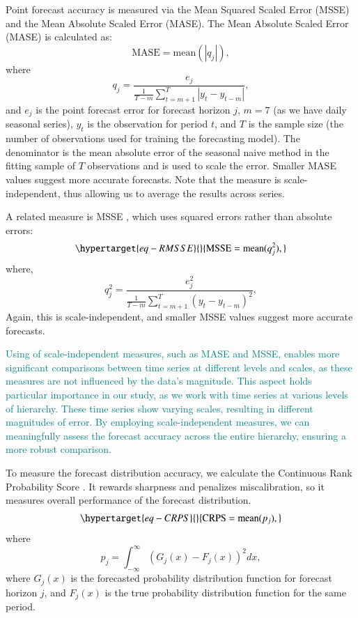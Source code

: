 \documentclass[
  authoryear,
  preprint,
  3p]{elsarticle}
\begin{document}
Point forecast accuracy is measured via the Mean Squared Scaled Error
(MSSE) and the Mean Absolute Scaled Error (MASE). The Mean Absolute
Scaled Error (MASE) \citep{HK06, hyndman2021forecasting} is calculated
as: \[
  \text{MASE} = \text{mean}(|q_{j}|),
\] where \[
  q_{j} = \frac{ e_{j}}
 {\displaystyle\frac{1}{T-m}\sum_{t=m+1}^T |y_{t}-y_{t-m}|},
\] and \(e_{j}\) is the point forecast error for forecast horizon \(j\),
\(m = 7\) (as we have daily seasonal series), \(y_t\) is the observation
for period \(t\), and \(T\) is the sample size (the number of
observations used for training the forecasting model). The denominator
is the mean absolute error of the seasonal naive method in the fitting
sample of \(T\) observations and is used to scale the error. Smaller
MASE values suggest more accurate forecasts. Note that the measure is
scale-independent, thus allowing us to average the results across
series.

A related measure is MSSE
\citep{hyndman2021forecasting, makridakis2022m5}, which uses squared
errors rather than absolute errors:
\begin{equation}\protect\hypertarget{eq-RMSSE}{}{
  \text{MSSE} = \text{mean}(q_{j}^2),
}\label{eq-RMSSE}\end{equation} where, \[
  q^2_{j} = \frac{ e^2_{j}}
 {\displaystyle\frac{1}{T-m}\sum_{t=m+1}^T (y_{t}-y_{t-m})^2},
\] Again, this is scale-independent, and smaller MSSE values suggest
more accurate forecasts.

\textcolor{teal}{Using of scale-independent measures, such as MASE and MSSE, enables more significant comparisons between time series at different levels and scales, as these measures are not influenced by the data's magnitude. This aspect holds particular importance in our study, as we work with time series at various levels of hierarchy. These time series show varying scales, resulting in different magnitudes of error. By employing scale-independent measures, we can meaningfully assess the forecast accuracy across the entire hierarchy, ensuring a more robust comparison.}

To measure the forecast distribution accuracy, we calculate the
Continuous Rank Probability Score
\citep{gneiting2014probabilistic, hyndman2021forecasting}. It rewards
sharpness and penalizes miscalibration, so it measures overall
performance of the forecast distribution.
\begin{equation}\protect\hypertarget{eq-CRPS}{}{
  \text{CRPS} = \text{mean}(p_j),
}\label{eq-CRPS}\end{equation} where \[
  p_j = \int_{-\infty}^{\infty} \left(G_j(x) - F_j(x)\right)^2dx,
\] where \(G_j(x)\) is the forecasted probability distribution function
for forecast horizon \(j\), and \(F_j(x)\) is the true probability
distribution function for the same period.
\end{document}
